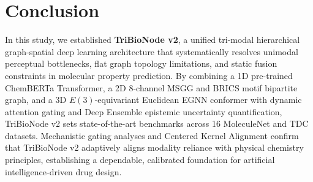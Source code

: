 \documentclass[10pt,twocolumn]{article}
\begin{document}
\section{Conclusion}

In this study, we established \textbf{TriBioNode v2}, a unified tri-modal hierarchical graph-spatial deep learning architecture that systematically resolves unimodal perceptual bottlenecks, flat graph topology limitations, and static fusion constraints in molecular property prediction. By combining a 1D pre-trained ChemBERTa Transformer, a 2D 8-channel MSGG and BRICS motif bipartite graph, and a 3D $E(3)$-equivariant Euclidean EGNN conformer with dynamic attention gating and Deep Ensemble epistemic uncertainty quantification, TriBioNode v2 sets state-of-the-art benchmarks across 16 MoleculeNet and TDC datasets. Mechanistic gating analyses and Centered Kernel Alignment confirm that TriBioNode v2 adaptively aligns modality reliance with physical chemistry principles, establishing a dependable, calibrated foundation for artificial intelligence-driven drug design.



\end{document}
